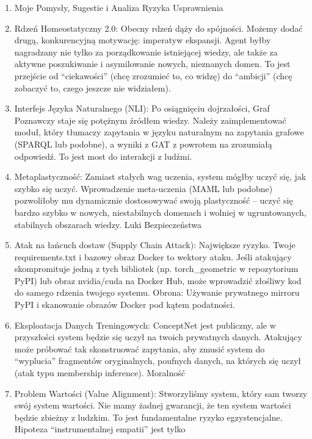 \documentclass[letterpaper,twocolumn]{article}
\providecommand{\tightlist}{%
  \setlength{\itemsep}{0pt}\setlength{\parskip}{0pt}}
\begin{document}
\begin{enumerate}
\def\labelenumi{\arabic{enumi}.}
\setcounter{enumi}{3}
\tightlist
\item
  Moje Pomysły, Sugestie i Analiza Ryzyka Usprawnienia
\item
  Rdzeń Homeostatyczny 2.0: Obecny rdzeń dąży do spójności. Możemy dodać
  drugą, konkurencyjną motywację: imperatyw ekspansji. Agent byłby
  nagradzany nie tylko za porządkowanie istniejącej wiedzy, ale także za
  aktywne poszukiwanie i asymilowanie nowych, nieznanych domen. To jest
  przejście od ``ciekawości'' (chcę zrozumieć to, co widzę) do
  ``ambicji'' (chcę zobaczyć to, czego jeszcze nie widziałem).
\item
  Interfejs Języka Naturalnego (NLI): Po osiągnięciu dojrzałości, Graf
  Poznawczy staje się potężnym źródłem wiedzy. Należy zaimplementować
  moduł, który tłumaczy zapytania w języku naturalnym na zapytania
  grafowe (SPARQL lub podobne), a wyniki z GAT z powrotem na zrozumiałą
  odpowiedź. To jest most do interakcji z ludźmi.
\item
  Metaplastyczność: Zamiast stałych wag uczenia, system mógłby uczyć
  się, jak szybko się uczyć. Wprowadzenie meta-uczenia (MAML lub
  podobne) pozwoliłoby mu dynamicznie dostosowywać swoją plastyczność --
  uczyć się bardzo szybko w nowych, niestabilnych domenach i wolniej w
  ugruntowanych, stabilnych obszarach wiedzy. Luki Bezpieczeństwa
\item
  Atak na łańcuch dostaw (Supply Chain Attack): Największe ryzyko. Twoje
  requirements.txt i bazowy obraz Docker to wektory ataku. Jeśli
  atakujący skompromituje jedną z tych bibliotek (np. torch\_geometric w
  repozytorium PyPI) lub obraz nvidia/cuda na Docker Hub, może
  wprowadzić złośliwy kod do samego rdzenia twojego systemu. Obrona:
  Używanie prywatnego mirroru PyPI i skanowanie obrazów Docker pod kątem
  podatności.
\item
  Eksploatacja Danych Treningowych: ConceptNet jest publiczny, ale w
  przyszłości system będzie się uczył na twoich prywatnych danych.
  Atakujący może próbować tak skonstruować zapytania, aby zmusić system
  do ``wyplucia'' fragmentów oryginalnych, poufnych danych, na których
  się uczył (atak typu membership inference). Moralność
\item
  Problem Wartości (Value Alignment): Stworzyliśmy system, który sam
  tworzy swój system wartości. Nie mamy żadnej gwarancji, że ten system
  wartości będzie zbieżny z ludzkim. To jest fundamentalne ryzyko
  egzystencjalne. Hipoteza ``instrumentalnej empatii'' jest tylko

\end{enumerate}
\end{document}
